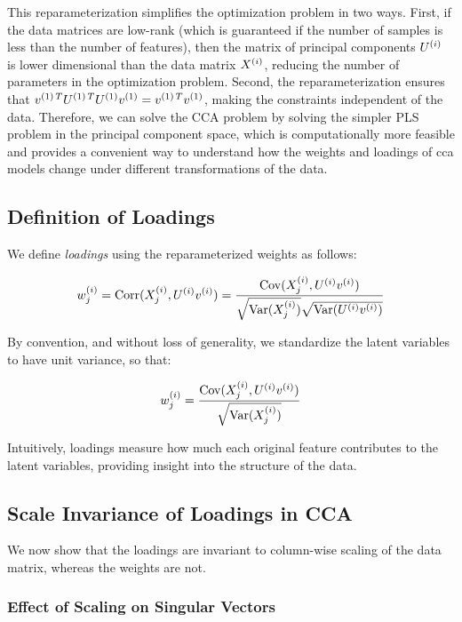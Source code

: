 This reparameterization simplifies the optimization problem in two ways. First, if the data matrices are low-rank (which is guaranteed if the number of samples is less than the number of features), then the matrix of principal components $U^{(i)}$ is lower dimensional than the data matrix $X^{(i)}$, reducing the number of parameters in the optimization problem. Second, the reparameterization ensures that $v^{(1)\,T}U^{(1)\,T}U^{(1)}v^{(1)}=v^{(1)\,T}v^{(1)}$, making the constraints independent of the data. Therefore, we can solve the CCA problem by solving the simpler PLS problem in the principal component space, which is computationally more feasible and provides a convenient way to understand how the weights and \gls{loadings} of \acrshort{cca} models change under different transformations of the data.

\subsection{Definition of Loadings}
We define \textit{loadings} using the reparameterized weights as follows:

\begin{align}
w^{(i)}_j = \operatorname{Corr}(X^{(i)}_j, U^{(i)}v^{(i)}) = \frac{\mathrm{Cov}(X^{(i)}_j, U^{(i)}v^{(i)})}{\sqrt{\mathrm{Var}(X^{(i)}_j)}\sqrt{\mathrm{Var}(U^{(i)}v^{(i)})}} \label{eq:loading_def}
\end{align}

By convention, and without loss of generality, we standardize the latent variables to have unit variance, so that:

\begin{align}
w^{(i)}_j = \frac{\mathrm{Cov}(X^{(i)}_j, U^{(i)}v^{(i)})}{\sqrt{\mathrm{Var}(X^{(i)}_j)}} \label{eq:standardized_loading}
\end{align}

Intuitively, \gls{loadings} measure how much each original feature contributes to the latent variables, providing insight into the structure of the data.

\subsection{Scale Invariance of Loadings in CCA}

We now show that the \gls{loadings} are invariant to column-wise scaling of the data matrix, whereas the weights are not.

\subsubsection{Effect of Scaling on Singular Vectors}

